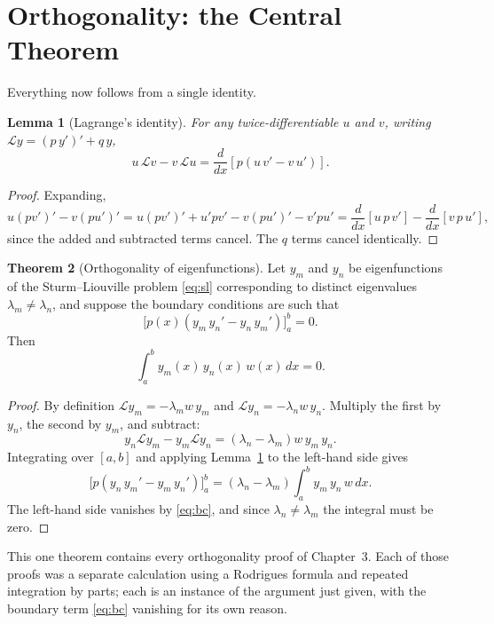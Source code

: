 \documentclass[12pt,a4paper]{report}
\theoremstyle{definition}
\newtheorem{thm}{Theorem}[section]
\theoremstyle{plain}
\newtheorem{lem}[thm]{Lemma}
\begin{document}
\section{Orthogonality: the Central Theorem}

Everything now follows from a single identity.

\begin{lem}[Lagrange's identity]
\label{lem:lagrange}
For any twice-differentiable $u$ and $v$, writing
$\mathcal{L}y = \left(p\,y'\right)' + q\,y$,
$$u\,\mathcal{L}v - v\,\mathcal{L}u = \frac{d}{dx}\left[p\left(u\,v' - v\,u'\right)\right].$$
\end{lem}

\begin{proof}
Expanding,
$$u\left(pv'\right)' - v\left(pu'\right)'
= u\left(pv'\right)' + u'pv' - v\left(pu'\right)' - v'pu'
= \frac{d}{dx}\left[u\,p\,v'\right]-\frac{d}{dx}\left[v\,p\,u'\right],$$
since the added and subtracted terms cancel. The $q$ terms cancel identically.
\end{proof}

\begin{thm}[Orthogonality of eigenfunctions]
\label{thm:slorth}
Let $y_m$ and $y_n$ be eigenfunctions of the Sturm--Liouville problem
\eqref{eq:sl} corresponding to distinct eigenvalues $\lambda_m\neq\lambda_n$,
and suppose the boundary conditions are such that
\begin{equation}
\Big[p(x)\left(y_m\,y_n' - y_n\,y_m'\right)\Big]^{b}_{a} = 0 .
\label{eq:bc}
\end{equation}
Then
$$\int^{b}_{a} y_m(x)\,y_n(x)\,w(x)\,dx = 0 .$$
\end{thm}

\begin{proof}
By definition $\mathcal{L}y_m = -\lambda_m w\,y_m$ and
$\mathcal{L}y_n = -\lambda_n w\,y_n$. Multiply the first by $y_n$, the second by
$y_m$, and subtract:
$$y_n\mathcal{L}y_m - y_m\mathcal{L}y_n
= \left(\lambda_n-\lambda_m\right)w\,y_m\,y_n .$$
Integrating over $[a,b]$ and applying Lemma~\ref{lem:lagrange} to the left-hand
side gives
$$\Big[p\left(y_n\,y_m'-y_m\,y_n'\right)\Big]^{b}_{a}
= \left(\lambda_n-\lambda_m\right)\int^{b}_{a}y_m\,y_n\,w\,dx .$$
The left-hand side vanishes by \eqref{eq:bc}, and since
$\lambda_n\neq\lambda_m$ the integral must be zero.
\end{proof}

This one theorem contains every orthogonality proof of Chapter~3. Each of those
proofs was a separate calculation using a Rodrigues formula and repeated
integration by parts; each is an instance of the argument just given, with the
boundary term \eqref{eq:bc} vanishing for its own reason.
\end{document}

